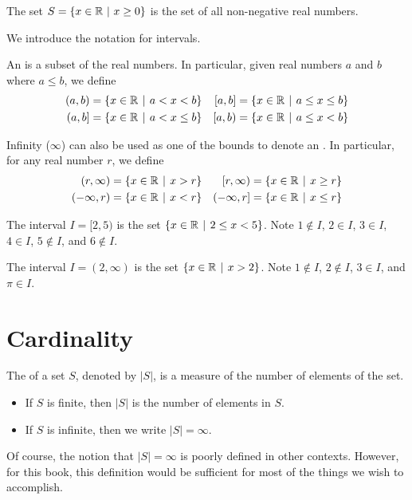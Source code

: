 \begin{example}
    The set $S = \{x \in \mathbb{R} \ | \ x \geq 0 \}$ is the set of all non-negative real numbers.
\end{example}

We introduce the notation for intervals.
\begin{definition}
    An  is a subset of the real numbers. In particular, given real numbers $a$ and $b$ where $a \leq b$, we define
    \begin{align*}
        (a,b) &= \{x \in \R \vert a < x < b\} & [a,b] &= \{x \in \R \vert a \leq x \leq b\}\\
        (a,b] &= \{x \in \R \vert a < x \leq b\} & [a,b) &= \{x \in \R \vert a \leq x < b\}
    \end{align*}

    Infinity ($\infty$) can also be used as one of the bounds to denote an . In particular, for any real number $r$, we define
    \begin{align*}
        (r, \infty) &= \{x \in \R \vert x > r\} & [r, \infty) &= \{x \in \R \vert x \geq r\}\\
        (-\infty,r) &= \{x \in \R \vert x < r\} & (-\infty,r] &= \{x \in \R \vert x \leq r\}
    \end{align*}
\end{definition}

\begin{example}
    The interval $I = [2, 5)$ is the set $\{x \in \R \vert 2 \leq x < 5\}$. Note $1 \notin I$, $2 \in I$, $3 \in I$, $4 \in I$, $5 \notin I$, and $6 \notin I$.
\end{example}

\begin{example}
    The interval $I = (2, \infty)$ is the set $\{x \in \R \vert x > 2\}$. Note $1 \notin I$, $2 \notin I$, $3 \in I$, and $\pi \in I$.
\end{example}

\section{Cardinality}
\begin{definition}
    The  of a set $S$, denoted by $|S|$, is a measure of the number of elements of the set.
    \begin{itemize}
        \item If $S$ is finite, then $|S|$ is the number of elements in $S$.
        \item If $S$ is infinite, then we write $|S| = \infty$.
    \end{itemize}
\end{definition}
\begin{remark}
    Of course, the notion that $|S| = \infty$ is poorly defined in other contexts. However, for this book, this definition would be sufficient for most of the things we wish to accomplish.
\end{remark}

